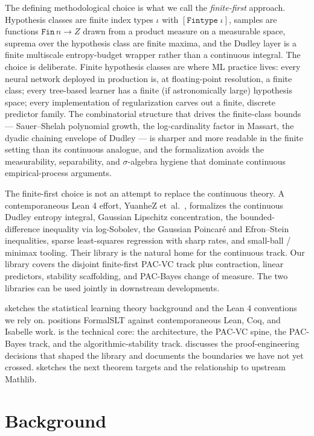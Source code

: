 \documentclass[sigplan,anonymous,review,screen]{acmart}
\begin{document}
The defining methodological choice is what we call the
\emph{finite-first} approach. Hypothesis classes are finite index types
$\iota$ with $[\texttt{Fintype}\;\iota]$, samples are functions
$\texttt{Fin}\,n \to Z$ drawn from a product measure on a measurable
space, suprema over the hypothesis class are finite maxima, and the
Dudley layer is a finite multiscale entropy-budget wrapper rather than
a continuous integral. The choice is deliberate. Finite hypothesis
classes are where ML practice lives: every neural network deployed in
production is, at floating-point resolution, a finite class; every
tree-based learner has a finite (if astronomically large) hypothesis
space; every implementation of regularization carves out a finite,
discrete predictor family. The combinatorial structure that drives the
finite-class bounds --- Sauer--Shelah polynomial growth, the
log-cardinality factor in Massart, the dyadic chaining envelope of
Dudley --- is sharper and more readable in the finite setting than its
continuous analogue, and the formalization avoids the measurability,
separability, and $\sigma$-algebra hygiene that dominate continuous
empirical-process arguments.

The finite-first choice is not an attempt to replace the continuous
theory. A contemporaneous Lean 4 effort, YuanheZ et~al.\
\cite{YuanheZ2026}, formalizes the continuous Dudley entropy
integral, Gaussian Lipschitz concentration, the bounded-difference
inequality via log-Sobolev, the Gaussian Poincar\'e and Efron--Stein
inequalities, sparse least-squares regression with sharp rates, and
small-ball / minimax tooling. Their library is the natural home for the
continuous track. Our library covers the disjoint finite-first PAC-VC
track plus contraction, linear predictors, stability scaffolding, and
PAC-Bayes change of measure. The two libraries can be used jointly in
downstream developments.

 sketches the statistical learning theory
background and the Lean 4 conventions we rely on.
 positions FormalSLT against contemporaneous Lean,
Coq, and Isabelle work. \Cref{sec:library} is the technical
core: the architecture, the PAC-VC spine, the PAC-Bayes track, and the
algorithmic-stability track. \Cref{sec:engineering} discusses the
proof-engineering decisions that shaped the library and documents the
boundaries we have not yet crossed. \Cref{sec:conclusion}
sketches the next theorem targets and the relationship to upstream
Mathlib.

\section{Background}
\label{sec:background}
\end{document}
